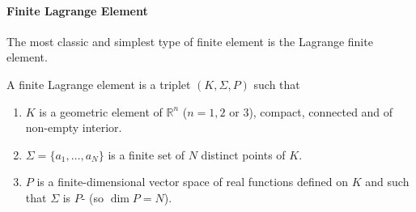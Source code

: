 \paragraph{Finite Lagrange Element}

The most classic and simplest type of finite element is the Lagrange finite element.

\begin{Def}
	A finite Lagrange element is a triplet $(K,\Sigma,P)$ such that 
	\begin{enumerate}[label=\textbullet]
		\item $K$ is a geometric element of $\mathbb{R}^n$ ($n=1,2$ or $3$), compact, connected and of non-empty interior.
		\item $\Sigma=\{a_1,\dots,a_N\}$ is a finite set of $N$ distinct points of $K$.
		\item $P$ is a finite-dimensional vector space of real functions defined on $K$ and such that $\Sigma$ is $P$- (so $\dim P=N$).
	\end{enumerate}
\end{Def}

